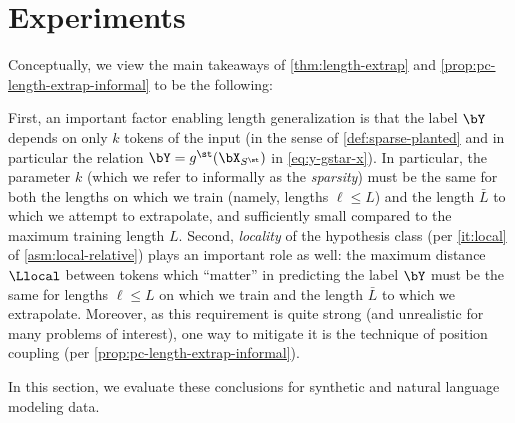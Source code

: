 \documentclass{article}
\newcommand{\arxiv}[1]{\iftoggle{icml}{}{#1}}
\newcommand{\icml}[1]{\iftoggle{icml}{#1}{}}
\begin{document}
\section{Experiments}
\label{sec:experiments}
Conceptually, we view the main takeaways of \cref{thm:length-extrap} and \cref{prop:pc-length-extrap-informal} to be the following:
\begin{enumerate}\icml{[itemsep=0.0em,topsep=0.0em,leftmargin=0.35cm,rightmargin=0cm]}
\label{it:ta-sparsity} First, an important factor enabling length generalization is that the label $\bY$ depends on only $k$ tokens of the input (in the sense of \cref{def:sparse-planted} and in particular the relation $\bY = g^\st(\bX_{S^\st})$ in \cref{eq:y-gstar-x}). In particular, the parameter $k$ (which we refer to informally as the \emph{sparsity}) must be the same for both the lengths on which we train (namely, lengths $\ell \leq L$) and the length $\bar L$ to which we attempt to extrapolate, and sufficiently small compared to the maximum training length $L$. 
\label{it:ta-locality} Second, \emph{locality} of the hypothesis class (per \cref{it:local} of \cref{asm:local-relative}) plays an important role as well: the maximum distance $\Llocal$ between tokens which ``matter'' in predicting the label $\bY$ must be the same for lengths $\ell \leq L$ on which we train and the length $\bar L$ to which we extrapolate. Moreover, as this requirement is quite strong (and unrealistic for many problems of interest), one way to mitigate it is the technique of position coupling (per \cref{prop:pc-length-extrap-informal}). 
\end{enumerate}



In this section, we evaluate these conclusions for synthetic and natural language modeling data. %

\arxiv{
  \begin{remark}
  \label{rmk:local-relative}
  One might wonder why we emphasize \cref{it:local} but not \cref{it:relative} of \cref{asm:local-relative} in takeaway \ref{it:ta-locality}. In fact, the conceptual message of \cref{it:relative}, namely that position IDs only influence attention scores by their \emph{relative} information (i.e., the difference between different positions) is already captured by the fact that it is common to use \emph{relative positional embeddings} and variants (e.g., RoPE \cite{su_roformer_2023}, FIRE \cite{li_functional_2024}) in many open-source transformer architectures. Due to the success of such embeddings, in this sense the constraint imposed by \cref{it:relative} can ``come for free''.
\end{remark}}
\end{document}
